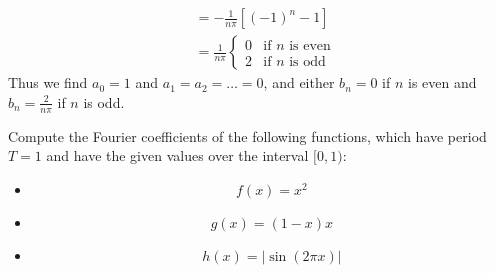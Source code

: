 \documentclass[11pt]{article}
\begin{document}
\begin{solution}
\begin{align*}
        \\
        &= 
        -
        \frac{1}{n\pi}
        \left[ (-1)^n - 1 \right] 
        \\
        &= 
        \frac{1}{n\pi}
        \begin{cases}
            0 & \text{if } n \text{ is even} 
            \\
            2 & \text{if } n \text{ is odd}
        \end{cases}
    \end{align*}
    Thus we find $a_0 = 1$ and $a_1 = a_2 = \dots = 0$,
    and either $b_n = 0$ if $n$ is even and $b_n = \frac{2}{n\pi}$ if $n$ is odd. 
\end{solution}


\begin{exercise}
    Compute the Fourier coefficients of the following functions, which have period $T = 1$ and have the given values over the interval $[0,1)$:
    \begin{itemize}
     \item 
     \[
        f(x) = x^{2}
     \]
     \item 
     \[
        g(x) = (1-x)x
     \]
     \item 
     \[
        h(x) = |\sin( 2 \pi x )|
     \]
    \end{itemize}
\end{exercise}
\end{document}
